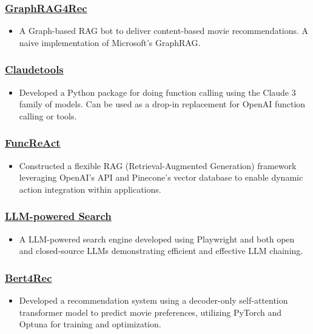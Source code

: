 \documentclass[11pt,a4paper]{article}
\begin{document}
\subsubsection*{\href{https://github.com/vatsalsaglani/GraphRAG4Rec}{GraphRAG4Rec}}
\begin{itemize}
    \item A Graph-based RAG bot to deliver content-based movie recommendations. A naive implementation of Microsoft's GraphRAG.
\end{itemize}
\subsubsection*{\href{https://github.com/vatsalsaglani/claudetools}{Claudetools}}
\begin{itemize}
    \item Developed a Python package for doing function calling using the Claude 3 family of models. Can be used as a drop-in replacement for OpenAI function calling or tools.
\end{itemize}
\subsubsection*{\href{https://github.com/vatsalsaglani/FuncReAct}{FuncReAct}}
\begin{itemize}
    \item Constructed a flexible RAG (Retrieval-Augmented Generation) framework leveraging OpenAI's API and Pinecone's vector database to enable dynamic action integration within applications.
\end{itemize}
\subsubsection*{\href{https://github.com/vatsalsaglani/rumage-ai-search}{LLM-powered Search}}
\begin{itemize}
    \item A LLM-powered search engine developed using Playwright and both open and closed-source LLMs demonstrating efficient and effective LLM chaining.
\end{itemize}
\subsubsection*{\href{https://github.com/vatsalsaglani/bert4rec}{Bert4Rec}}
\begin{itemize}
    \item Developed a recommendation system using a decoder-only self-attention transformer model to predict movie preferences, utilizing PyTorch and Optuna for training and optimization.
\end{itemize}
\end{document}
